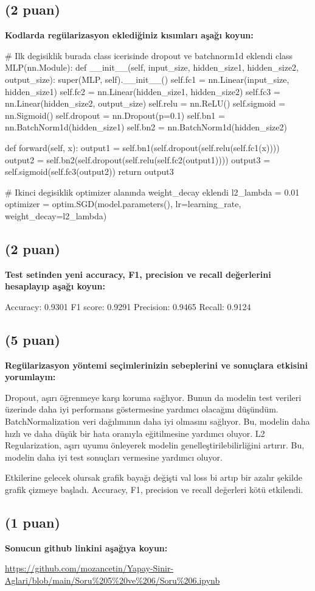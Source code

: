 \documentclass[11pt]{article}
\begin{document}
\subsection{(2 puan)} \textbf{Kodlarda regülarizasyon eklediğiniz kısımları aşağı koyun:} 

\begin{python}
# Ilk degisiklik burada class icerisinde dropout ve batchnorm1d eklendi
class MLP(nn.Module):
    def __init__(self, input_size, hidden_size1, hidden_size2, output_size):
        super(MLP, self).__init__()
        self.fc1 = nn.Linear(input_size, hidden_size1)
        self.fc2 = nn.Linear(hidden_size1, hidden_size2)
        self.fc3 = nn.Linear(hidden_size2, output_size)
        self.relu = nn.ReLU()
        self.sigmoid = nn.Sigmoid()
        self.dropout = nn.Dropout(p=0.1)
        self.bn1 = nn.BatchNorm1d(hidden_size1)
        self.bn2 = nn.BatchNorm1d(hidden_size2)

    def forward(self, x):
        output1 = self.bn1(self.dropout(self.relu(self.fc1(x))))
        output2 = self.bn2(self.dropout(self.relu(self.fc2(output1))))
        output3 = self.sigmoid(self.fc3(output2))
        return output3
        
# Ikinci degisiklik optimizer alanında weight_decay eklendi
l2_lambda = 0.01
optimizer = optim.SGD(model.parameters(), lr=learning_rate, weight_decay=l2_lambda)
\end{python}

\subsection{(2 puan)} \textbf{Test setinden yeni accuracy, F1, precision ve recall değerlerini hesaplayıp aşağı koyun:}

Accuracy: 0.9301
F1 score: 0.9291
Precision: 0.9465
Recall: 0.9124

\subsection{(5 puan)} \textbf{Regülarizasyon yöntemi seçimlerinizin sebeplerini ve sonuçlara etkisini yorumlayın:}

Dropout, aşırı öğrenmeye karşı koruma sağlıyor. Bunun da modelin test verileri üzerinde daha iyi performans göstermesine yardımcı olacağını düşündüm.
BatchNormalization veri dağılımının daha iyi olmasını sağlıyor. Bu, modelin daha hızlı ve daha düşük bir hata oranıyla eğitilmesine yardımcı oluyor.
L2 Regularization, aşırı uyumu önleyerek modelin genelleştirilebilirliğini artırır. Bu, modelin daha iyi test sonuçları vermesine yardımcı oluyor.

Etkilerine gelecek olursak grafik bayağı değişti val loss bi artıp bir azalır şekilde grafik çizmeye başladı. Accuracy, F1, precision ve recall değerleri kötü etkilendi.

\subsection{(1 puan)} \textbf{Sonucun github linkini  aşağıya koyun:}

\url{https://github.com/mozancetin/Yapay-Sinir-Aglari/blob/main/Soru%205%20ve%206/Soru%206.ipynb}
\end{document}
